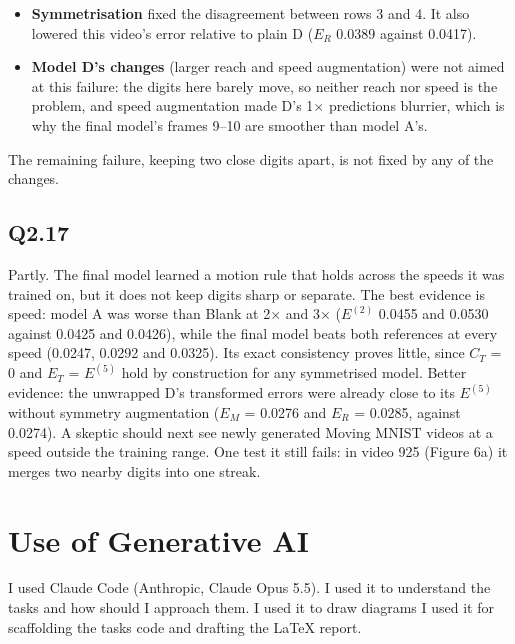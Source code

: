 \documentclass[11pt]{article}
\begin{document}
\begin{itemize}
\item
  \textbf{Symmetrisation} fixed the disagreement between rows 3 and 4. It also lowered this video's error relative to plain D (\(E_R\) 0.0389 against 0.0417).
\item
  \textbf{Model D's changes} (larger reach and speed augmentation) were not aimed at this failure: the digits here barely move, so neither reach nor speed is the problem, and speed augmentation made D's 1× predictions blurrier, which is why the final model's frames 9--10 are smoother than model A's.
\end{itemize}

The remaining failure, keeping two close digits apart, is not fixed by any of the changes.


\subsection*{Q2.17}
Partly. The final model learned a motion rule that holds across the speeds it was trained on, but it does not keep digits sharp or separate. The best evidence is speed: model A was worse than Blank at 2× and 3× (\(E^{(2)}\) 0.0455 and 0.0530 against 0.0425 and 0.0426), while the final model beats both references at every speed (0.0247, 0.0292 and 0.0325). Its exact consistency proves little, since \(C_T\) = 0 and \(E_T\) = \(E^{(5)}\) hold by construction for any symmetrised model. Better evidence: the unwrapped D's transformed errors were already close to its \(E^{(5)}\) without symmetry augmentation (\(E_M\) = 0.0276 and \(E_R\) = 0.0285, against 0.0274). A skeptic should next see newly generated Moving MNIST videos at a speed outside the training range. One test it still fails: in video 925 (Figure 6a) it merges two nearby digits into one streak.


\newpage
\section*{Use of Generative AI}
I used Claude Code (Anthropic, Claude Opus 5.5). 
I used it to understand the tasks and how should I approach them.
I used it to draw diagrams
I used it for scaffolding the tasks code and drafting the LaTeX report.
\end{document}
